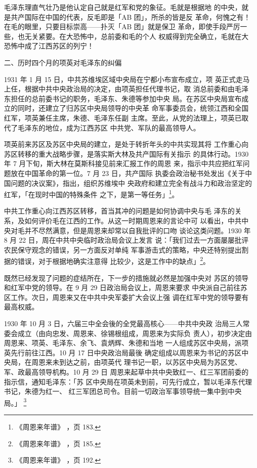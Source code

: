 毛泽东理直气壮乃是他认定自己就是红军和党的象征。毛就是根据地
的中央，就是共产国际在中国的代表，反毛即是「AB 团」，所杀的皆是反
革命，何愧之有！在毛的眼里，只要目标崇高——扑灭「AB 团」就是保卫
革命，即使手段严厉一些，也无关紧要。在大恐怖中，总前委和毛的个人
权威得到完全确立，毛就在大恐怖中成了江西苏区的列宁！

二、历时四个月的项英对毛泽东的纠偏

1931 年 1 月 15 日，中共苏维埃区域中央局在宁都小布宣布成立，项
英正式走马上任，根据中共中央政治局的决定，由项英担任代理书记，取
消总前委和由毛泽东担任的总前委书记的职务，毛泽东、朱德等参加中央
局。在苏区中央局宣布成立的同时，还建立了归苏区中央局领导的中央革
命军事委员会，统领江西和全国红军，项英兼任主席，朱德、毛泽东任副
主席。至此，从党的法理上，项英已取代了毛泽东的地位，成为江西苏区
中共党、军队的最高领导人。

项英前来苏区及苏区中央局的建立，是处于转折年头的中共实现其将
工作重心向苏区转移的重大战略步骤，是落实斯大林及共产国际有关指示
的具体行动。1930 年 7 月下旬，斯大林在莫斯科接见前来汇报工作的周恩
来，指示中共应把红军问题放在中国革命的第一位。7 月 23 日，共产国际
执委会政治秘书处发出《关于中国问题的决议案》，指出，组织苏维埃中
央政府和建立完全有战斗力和政治坚定的红军，「在现时中国的特殊条件
之下，是第一等任务」\footnote{ 《周恩来年谱》
，页 183.}。

中共工作重心向江西苏区转移，首当其冲的问题是如何协调中央与毛
泽东的关系，及如何评价毛在江西的工作。从这一时期周恩来的言论中可
以看出，中共中央对毛并不尽然满意，但是周恩来却常以自我批评的口吻
谈论这类问题。1930 年 8 月 22 日，周在中共中央临时政治局会议上发言
说：「我们过去一方面屡屡批评农民保守观念的错误，另一方面反对单纯
军事游击式的策略，中央还特别提出割据的错误，对于根据地确实注意得
比较少，这是工作中的缺点」\footnote{ 《周恩来年谱》
，页 185.}。
 
既然已经发现了问题的症结所在，下一步的措施就必然是加强中央对
苏区的领导和红军中党的领导。在 9 月 29 日政治局会议上，周恩来要求
中央派自己前往苏区工作。次日，周恩来又在中共中央军委扩大会议上强
调在红军中党的领导要有最高权威。

1930 年 10 月 3 日，六届三中全会後的全党最高核心——中共中央政
治局三人常委会成立（由向忠发、周恩来、徐锡根组成，周恩来为实际负
责人），初步决定由周恩来、项英、毛泽东、余飞、袁炳辉、朱德和当地
一人组成苏区中央局，派项英先行前往江西。10 月 17 日中央政治局最後
确定组成以周恩来为书记的苏区中央局，在周恩来未到达之前，由项英代
理书记一职，以苏区中央局为苏区党、军、政最高领导机构。10 月 29 日
周恩来起草中共中央致红一、红三军团前委的指示信，通知毛泽东：「苏
区中央局在项英未到前，可先行成立，暂以毛泽东代理书记，朱德为红一、
红三军团总司令。目前一切政治军事领导统一集中到中央局。」
\footnote{ 《周恩来年谱》
，页 192.}

